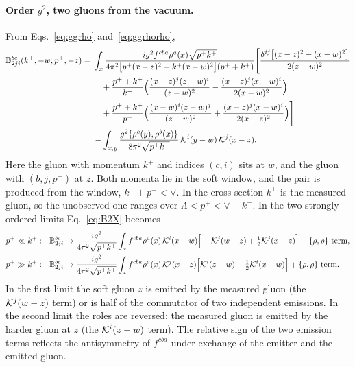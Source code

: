 \paragraph*{Order $g^2$, two gluons from the vacuum.} From Eqs.~\eqref{eq:ggrho} and~\eqref{eq:ggrhorho},
\begin{align}
\mathbb{B}^{bc}_{2ji}(k^+,-w;p^+,-z)={}&\int_x\frac{ig^2f^{cba}\rho^a(x)\sqrt{p^+k^+}}{4\pi^2\big[p^+(x-z)^2+k^+(x-w)^2\big](p^++k^+)}\Bigg[\frac{\delta^{ij}\big[(x-z)^2-(x-w)^2\big]}{2(z-w)^2}\notag\\
&\quad+\frac{p^++k^+}{k^+}\Big(\frac{(x-z)^j(z-w)^i}{(z-w)^2}-\frac{(x-z)^j(x-w)^i}{2(x-w)^2}\Big)\notag\\
&\quad+\frac{p^++k^+}{p^+}\Big(\frac{(x-w)^i(z-w)^j}{(z-w)^2}+\frac{(x-z)^j(x-w)^i}{2(x-z)^2}\Big)\Bigg]\notag\\
&-\int_{x,y}\frac{g^2\{\rho^c(y),\rho^b(x)\}}{8\pi^2\sqrt{p^+k^+}}\,\mathcal{K}^i(y-w)\,\mathcal{K}^j(x-z).
\label{eq:B2X}
\end{align}
Here the gluon with momentum $k^+$ and indices $(c,i)$ sits at $w$, and the gluon with $(b,j,p^+)$ at $z$. Both momenta lie in the soft window, and the pair is produced from the window, $k^++p^+<\vee$. In the cross section $k^+$ is the measured gluon, so the unobserved one ranges over $\Lambda<p^+<\vee-k^+$. In the two strongly ordered limits Eq.~\eqref{eq:B2X} becomes
\begin{align}
p^+\ll k^+:\quad&\mathbb{B}^{bc}_{2ji}\to\frac{ig^2}{4\pi^2\sqrt{p^+k^+}}\int_xf^{cba}\rho^a(x)\,\mathcal{K}^i(x-w)\Big[-\mathcal{K}^j(w-z)+\tfrac12\mathcal{K}^j(x-z)\Big]+\{\rho,\rho\}\text{ term},\label{eq:B2soft}\\
p^+\gg k^+:\quad&\mathbb{B}^{bc}_{2ji}\to\frac{ig^2}{4\pi^2\sqrt{p^+k^+}}\int_xf^{cba}\rho^a(x)\,\mathcal{K}^j(x-z)\Big[\mathcal{K}^i(z-w)-\tfrac12\mathcal{K}^i(x-w)\Big]+\{\rho,\rho\}\text{ term}.\label{eq:B2hard}
\end{align}
In the first limit the soft gluon $z$ is emitted by the measured gluon (the $\mathcal{K}^j(w-z)$ term) or is half of the commutator of two independent emissions. In the second limit the roles are reversed: the measured gluon is emitted by the harder gluon at $z$ (the $\mathcal{K}^i(z-w)$ term). The relative sign of the two emission terms reflects the antisymmetry of $f^{cba}$ under exchange of the emitter and the emitted gluon.

